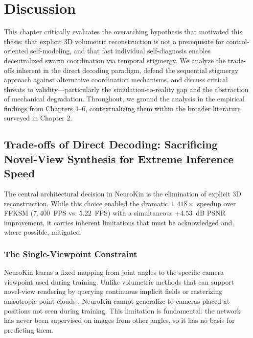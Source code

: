 \documentclass[12pt,a4paper,oneside]{report}
\begin{document}
\chapter{Discussion}
\label{chap:discussion_main}

This chapter critically evaluates the overarching hypothesis that motivated this thesis: that explicit 3D volumetric reconstruction is not a prerequisite for control-oriented self-modeling, and that fast individual self-diagnosis enables decentralized swarm coordination via temporal stigmergy. We analyze the trade-offs inherent in the direct decoding paradigm, defend the sequential stigmergy approach against alternative coordination mechanisms, and discuss critical threats to validity---particularly the simulation-to-reality gap and the abstraction of mechanical degradation. Throughout, we ground the analysis in the empirical findings from Chapters 4--6, contextualizing them within the broader literature surveyed in Chapter 2.

\section{Trade-offs of Direct Decoding: Sacrificing Novel-View Synthesis for Extreme Inference Speed}
\label{sec:tradeoffs_direct_decoding}

The central architectural decision in NeuroKin is the elimination of explicit 3D reconstruction. While this choice enabled the dramatic $1,418\times$ speedup over FFKSM ($7,400$~FPS vs. $5.22$~FPS) with a simultaneous $+4.53$~dB PSNR improvement, it carries inherent limitations that must be acknowledged and, where possible, mitigated.

\subsection{The Single-Viewpoint Constraint}
\label{subsec:single_viewpoint_constraint_discussion}
NeuroKin learns a fixed mapping from joint angles to the specific camera viewpoint used during training. Unlike volumetric methods that can support novel-view rendering by querying continuous implicit fields \cite{mildenhall2020nerf, pumarola2021d} or rasterizing anisotropic point clouds \cite{kerbl20233d, hu2025learning}, NeuroKin cannot generalize to cameras placed at positions not seen during training. This limitation is fundamental: the network has never been supervised on images from other angles, so it has no basis for predicting them.
\end{document}
